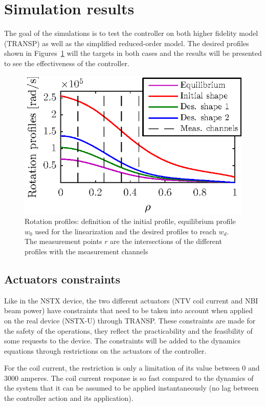 \documentclass[12pt,lot, lof]{puthesis}
\begin{document}
\section{Simulation results} 

\label{results}

The goal of the simulations is to test the controller on both higher fidelity model (TRANSP) as well as the simplified reduced-order model.  The desired profiles shown in Figures~\ref{initnstxu} will the targets in both cases and the results will be presented to see the effectiveness of the controller.

\begin{figure}[htbp]
	\centering
	\includegraphics[width=0.7 \linewidth]{chap10/initial}
	\caption{Rotation profiles: definition of the initial profile, equilibrium profile $w_0$ used for the linearization and the desired profiles to reach $w_d$. The measurement points $r$ are the intersections of the different profiles with the measurement channels}
	\label{initnstxu}
\end{figure}

\subsection{Actuators constraints}
\label{constraintsnstxu}
Like in the NSTX device, the two different actuators (NTV coil current and NBI beam power) have constraints that need to be taken into account when applied on the real device (NSTX-U) through TRANSP. These constraints are made for the safety of the operations, they reflect the practicability and the feasibility of some requests to the device. The constraints will be added to the dynamics equations through restrictions on the actuators of the controller.

For the coil current, the restriction is only a limitation of its value between 0 and 3000 amperes.
The coil current response is so fast compared to the dynamics of the system that it can be assumed to be applied instantaneously (no lag between the controller action and its application).
\end{document}
